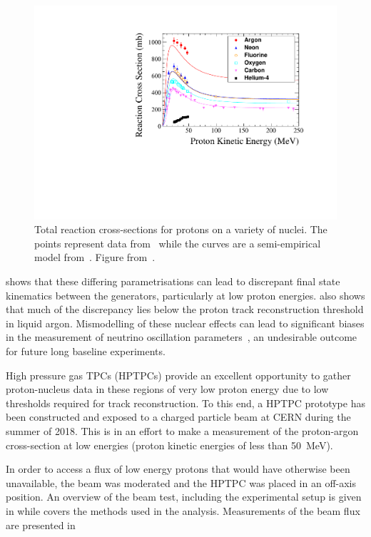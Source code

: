 \begin{figure}[h]
  \centering
  \includegraphics[width=.8\linewidth]{files/figures/hptpc_beam_flux/DataProtonCrossSections}
  \caption[Proton-nucleus cross-section data compared with a semi-empirical model]{Total reaction cross-sections for protons on a variety of nuclei. The points represent data from~\cite{protonXSecData} while the curves are a semi-empirical model from~\cite{protonXSecModel}. Figure from~\cite{hptpcProposal}.}
  \label{fig:protonNucleus}
\end{figure}

 shows that these differing parametrisations can lead to discrepant final state kinematics between the generators, particularly at low proton energies.
 also shows that much of the discrepancy lies below the proton track reconstruction threshold in liquid argon.
Mismodelling of these nuclear effects can lead to significant biases in the measurement of neutrino oscillation parameters~\cite{nuclearMismodelOsc}, an undesirable outcome for future long baseline experiments.

High pressure gas TPCs (HPTPCs) provide an excellent opportunity to gather proton-nucleus data in these regions of very low proton energy due to low thresholds required for track reconstruction.
To this end, a HPTPC prototype has been constructed and exposed to a charged particle beam at CERN during the summer of 2018.
This is in an effort to make a measurement of the proton-argon cross-section at low energies (proton kinetic energies of less than \SI{50}{\mega\electronvolt}).

In order to access a flux of low energy protons that would have otherwise been unavailable, the beam was moderated and the HPTPC was placed in an off-axis position. 
An overview of the beam test, including the experimental setup is given in  while  covers the methods used in the analysis. 
Measurements of the beam flux are presented in 

